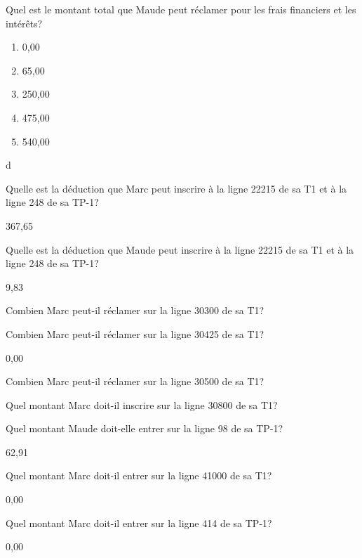 \begin{question}
	Quel est le montant total que Maude peut réclamer pour les frais financiers et les intérêts?
	\begin{enumerate}[label=\alph*)]
		\item 0,00
		\item 65,00
		\item 250,00
		\item 475,00
		\item 540,00
	\end{enumerate}
\end{question}
d

\begin{question}
	Quelle est la déduction que Marc peut inscrire à la ligne 22215 de sa T1 et à la ligne 248 de sa TP-1?
\end{question}
367,65

\begin{question}
	Quelle est la déduction que Maude peut inscrire à la ligne 22215 de sa T1 et à la ligne 248 de sa TP-1?
\end{question}
9,83

\begin{question}
	Combien Marc peut-il réclamer sur la ligne 30300 de sa T1?
\end{question}

\begin{question}
	Combien Marc peut-il réclamer sur la ligne 30425 de sa T1?
\end{question}
0,00

\begin{question}
	Combien Marc peut-il réclamer sur la ligne 30500 de sa T1?
\end{question}

\begin{question}
	Quel montant Marc doit-il inscrire sur la ligne 30800 de sa T1?
\end{question}

\begin{question}
	Quel montant Maude doit-elle entrer sur la ligne 98 de sa TP-1?
\end{question}
62,91

\begin{question}
	Quel montant Marc doit-il entrer sur la ligne 41000 de sa T1?
\end{question}
0,00

\begin{question}
	Quel montant Marc doit-il entrer sur la ligne 414 de sa TP-1?
\end{question}
0,00

